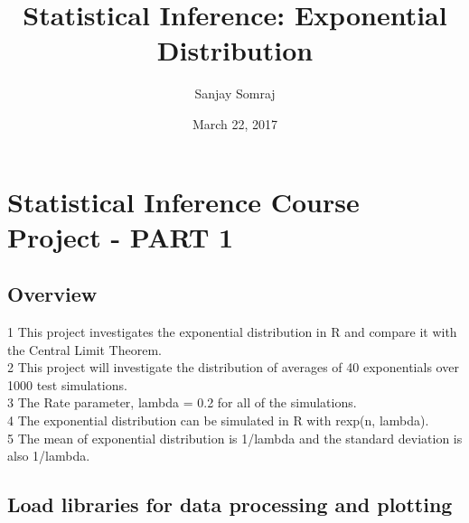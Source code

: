 \documentclass[]{article}
\title{Statistical Inference: Exponential Distribution}
\author{Sanjay Somraj}
\date{March 22, 2017}
\begin{document}
\maketitle

\section{Statistical Inference Course Project - PART
1}\label{statistical-inference-course-project---part-1}

\subsection{Overview}\label{overview}

1 This project investigates the exponential distribution in R and
compare it with the Central Limit Theorem.\\
2 This project will investigate the distribution of averages of 40
exponentials over 1000 test simulations.\\
3 The Rate parameter, lambda = 0.2 for all of the simulations.\\
4 The exponential distribution can be simulated in R with rexp(n,
lambda).\\
5 The mean of exponential distribution is 1/lambda and the standard
deviation is also 1/lambda.

\subsection{Load libraries for data processing and
plotting}\label{load-libraries-for-data-processing-and-plotting}
\end{document}
